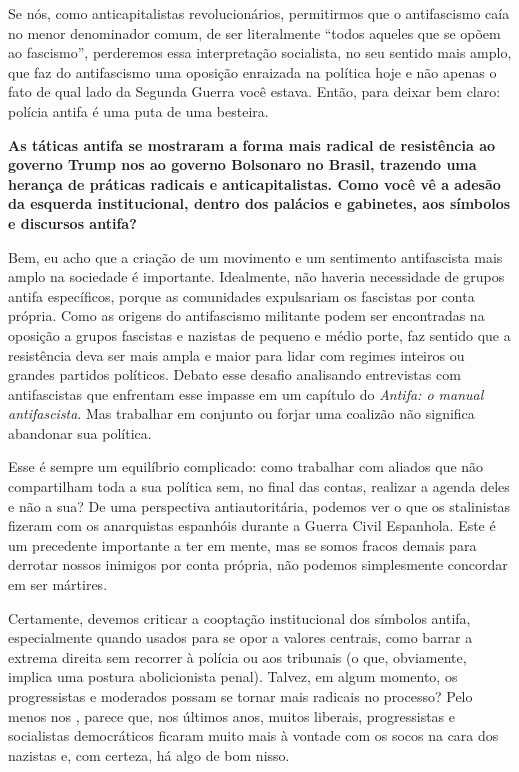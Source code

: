 Se nós, como anticapitalistas revolucionários, permitirmos que o antifascismo caía no menor denominador comum, de ser literalmente ``todos aqueles que se opõem ao fascismo'', perderemos essa interpretação socialista, no seu sentido mais amplo, que faz do antifascismo uma oposição enraizada na política hoje e não apenas o fato de qual lado da Segunda Guerra você estava. Então, para deixar bem claro: polícia antifa é uma puta de uma besteira. 

\bigskip

\noindent{}\textbf{As táticas antifa se mostraram a forma mais radical de resistência ao governo Trump nos  ao governo Bolsonaro no Brasil, trazendo uma herança de práticas radicais e anticapitalistas. Como você vê a adesão da esquerda institucional, dentro dos palácios e gabinetes, aos símbolos e discursos antifa?}
 
Bem, eu acho que a criação de um movimento e um sentimento antifascista mais amplo na sociedade é importante. Idealmente, não haveria necessidade de grupos antifa específicos, porque as comunidades expulsariam os fascistas por conta própria. Como as origens do antifascismo militante podem ser encontradas na oposição a grupos fascistas e nazistas de pequeno e médio porte, faz sentido que a resistência deva ser mais ampla e maior para lidar com regimes inteiros ou grandes partidos políticos. Debato esse desafio analisando entrevistas com antifascistas que enfrentam esse impasse em um capítulo do \emph{Antifa: o manual antifascista}. Mas trabalhar em conjunto ou forjar uma coalizão não significa abandonar sua política. 
 
Esse é sempre um equilíbrio complicado: como trabalhar com aliados que não compartilham toda a sua política sem, no final das contas, realizar a agenda deles e não a sua? De uma perspectiva antiautoritária, podemos ver o que os stalinistas fizeram com os anarquistas espanhóis durante a Guerra Civil Espanhola. Este é um precedente importante a ter em mente, mas se somos fracos demais para derrotar nossos inimigos por conta própria, não podemos simplesmente concordar em ser mártires. 

Certamente, devemos criticar a cooptação institucional dos símbolos antifa, especialmente quando usados para se opor a valores centrais, como barrar a extrema direita sem recorrer à polícia ou aos tribunais (o que, obviamente, implica uma postura abolicionista penal). Talvez, em algum momento, os progressistas e moderados possam se tornar mais radicais no processo? Pelo menos nos , parece que, nos últimos anos, muitos liberais, progressistas e socialistas democráticos ficaram muito mais à vontade com os socos na cara dos nazistas e, com certeza, há algo de bom nisso.

